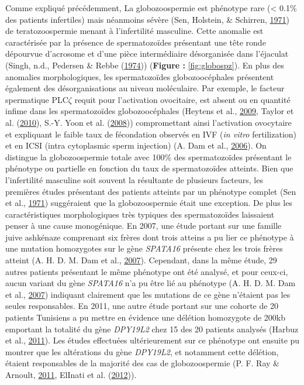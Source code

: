 \documentclass[12pt,twoside]{reedthesis}
\theoremstyle{definition}
\theoremstyle{definition}
\theoremstyle{remark}
\begin{document}
  Comme expliqué précédemment, La globozoospermie est phénotype rare
  (\textless{} 0.1\% des patients infertiles) mais néanmoins sévère (Sen,
  Holstein, \& Schirren, \protect\hyperlink{ref-Sen2009}{1971}) de
  teratozoospermie menant à l'infertilité masculine. Cette anomalie est
  caractérisée par la présence de spermatozoïdes présentant une tête ronde
  dépourvue d'acrosome et d'une pièce intermédiaire désorganisée dans
  l'éjaculat (Singh, n.d., Pedersen \& Rebbe
  (\protect\hyperlink{ref-Pedersen1974}{1974})) (\textbf{Figure :
  }\ref{fig:globospz}). En plus des anomalies morphologiques, les
  spermatozoïdes globozoocéphales présentent également des
  désorganisations au niveau moléculaire. Par exemple, le facteur
  spermatique PLC\(\zeta\) requit pour l'activation ovocitaire, est absent
  ou en quantité infime dans les spermatozoïdes globozoocéphales (Heytens
  et al., \protect\hyperlink{ref-Heytens2009}{2009}, Taylor et al.
  (\protect\hyperlink{ref-Taylor2010}{2010}), S.-Y. Yoon et al.
  (\protect\hyperlink{ref-Yoon2008}{2008})) compromettant ainsi
  l'activation ovocytaire et expliquant le faible taux de fécondation
  observés en IVF (\emph{in vitro} fertilization) et en ICSI (intra
  cytoplasmic sperm injection) (A. Dam et al.,
  \protect\hyperlink{ref-Dam2006}{2006}). On distingue la globozoospermie
  totale avec 100\% des spermatozoïdes présentant le phénotype ou
  partielle en fonction du taux de spermatozoïdes atteints. Bien que
  l'infertilité masculine soit souvent la résultante de plusieurs
  facteurs, les premières études présentant des patients atteints par un
  phénotype complet (Sen et al., \protect\hyperlink{ref-Sen2009}{1971})
  suggéraient que la globozoospermie était une exception. De plus les
  caractéristiques morphologiques très typiques des spermatozoïdes
  laissaient penser à une cause monogénique. En 2007, une étude portant
  sur une famille juive ashkénaze comprenant six frères dont trois atteins
  a pu lier ce phénotype à une mutation homozygotes sur le gène
  \emph{SPATA16} présente chez les trois frères atteint (A. H. D. M. Dam
  et al., \protect\hyperlink{ref-Dam2007}{2007}). Cependant, dans la même
  étude, 29 autres patients présentant le même phénotype ont été analysé,
  et pour ceux-ci, aucun variant du gène \emph{SPATA16} n'a pu être lié au
  phénotype (A. H. D. M. Dam et al.,
  \protect\hyperlink{ref-Dam2007}{2007}) indiquant clairement que les
  mutations de ce gène n'étaient pas les seules responsables. En 2011, une
  autre étude portant sur une cohorte de 20 patients Tunisiens a pu mettre
  en évidence une délétion homozygote de 200kb emportant la totalité du
  gène \emph{DPY19L2} chez 15 des 20 patients analysés (Harbuz et al.,
  \protect\hyperlink{ref-Harbuz2011}{2011}). Les études effectuées
  ultérieurement sur ce phénotype ont ensuite pu montrer que les
  altérations du gène \emph{DPY19L2}, et notamment cette délétion, étaient
  responsables de la majorité des cas de globozoospermie (P. F. Ray \&
  Arnoult, \protect\hyperlink{ref-Ray2011}{2011}, ElInati et al.
  (\protect\hyperlink{ref-ElInati2012}{2012})).
  
\end{document}
